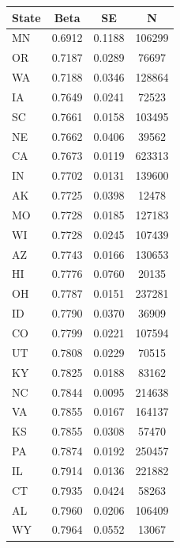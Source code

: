 \begin{tabular}{l c c c}
\hline
State & Beta & SE & N \\
\hline
MN & 0.6912 & 0.1188 & 106299 \\
OR & 0.7187 & 0.0289 & 76697 \\
WA & 0.7188 & 0.0346 & 128864 \\
IA & 0.7649 & 0.0241 & 72523 \\
SC & 0.7661 & 0.0158 & 103495 \\
NE & 0.7662 & 0.0406 & 39562 \\
CA & 0.7673 & 0.0119 & 623313 \\
IN & 0.7702 & 0.0131 & 139600 \\
AK & 0.7725 & 0.0398 & 12478 \\
MO & 0.7728 & 0.0185 & 127183 \\
WI & 0.7728 & 0.0245 & 107439 \\
AZ & 0.7743 & 0.0166 & 130653 \\
HI & 0.7776 & 0.0760 & 20135 \\
OH & 0.7787 & 0.0151 & 237281 \\
ID & 0.7790 & 0.0370 & 36909 \\
CO & 0.7799 & 0.0221 & 107594 \\
UT & 0.7808 & 0.0229 & 70515 \\
KY & 0.7825 & 0.0188 & 83162 \\
NC & 0.7844 & 0.0095 & 214638 \\
VA & 0.7855 & 0.0167 & 164137 \\
KS & 0.7855 & 0.0308 & 57470 \\
PA & 0.7874 & 0.0192 & 250457 \\
IL & 0.7914 & 0.0136 & 221882 \\
CT & 0.7935 & 0.0424 & 58263 \\
AL & 0.7960 & 0.0206 & 106409 \\
WY & 0.7964 & 0.0552 & 13067 \\
\hline
\end{tabular}
